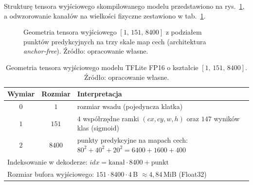 Strukturę tensora wyjściowego skompilowanego modelu przedstawiono na rys.~\ref{fig:tensor_geometria}, a odwzorowanie kanałów na wielkości fizyczne zestawiono w tab.~\ref{tab:tensor}.

\begin{figure}[htbp]
 \centering
 \caption{Geometria tensora wyjściowego $[1,\,151,\,8400]$ z podziałem punktów predykcyjnych na trzy skale map cech (architektura \textit{anchor-free}). Źródło: opracowanie własne.}
 \label{fig:tensor_geometria}
\end{figure}

\begin{table}[htbp]
 \centering
 \caption{Geometria tensora wyjściowego modelu TFLite FP16 o kształcie $[1,\,151,\,8400]$. Źródło: opracowanie własne.}
 \label{tab:tensor}
 \begin{tabular}{|c|c|p{7.3cm}|}
 \hline
 \textbf{Wymiar} & \textbf{Rozmiar} & \textbf{Interpretacja} \\
 \hline \hline
 $0$ & $1$ & rozmiar wsadu (pojedyncza klatka) \\
 \hline
 $1$ & $151$ & $4$ współrzędne ramki $(\mathit{cx},\mathit{cy},w,h)$ oraz $147$ wyników klas (sigmoid) \\
 \hline
 $2$ & $8400$ & punkty predykcyjne na mapach cech: $80^2 + 40^2 + 20^2 = 6400+1600+400$ \\
 \hline \hline
 \multicolumn{3}{|l|}{Indeksowanie w dekoderze: $\mathit{idx} = \text{kanał} \cdot 8400 + \text{punkt}$} \\
 \hline
 \multicolumn{3}{|l|}{Rozmiar bufora wyjściowego: $151 \cdot 8400 \cdot 4$\,B $\approx 4{,}84$\,MiB (Float32)} \\
 \hline
 \end{tabular}
\end{table}

